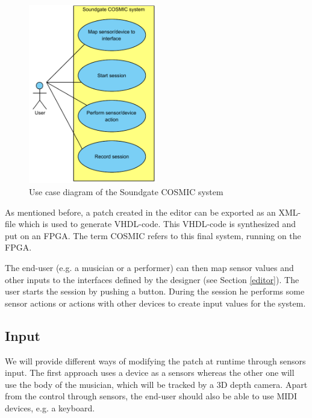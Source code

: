 	\begin{figure}[!h]
		\centering
			\includegraphics[width=0.50\textwidth]{images/User_View.pdf}
		\caption{Use case diagram of the Soundgate COSMIC system}
		\label{fig:Soundgate_UserInterface}
	\end{figure}
	
	As mentioned before, a patch created in the editor can be exported as an XML-file which is used to generate VHDL-code. 
	This VHDL-code is synthesized and put on an \ac{FPGA}. 
	The term \ac{COSMIC} refers to this final system, running on the \ac{FPGA}.
	
	The end-user (e.g. a musician or a performer) can then map sensor values and other inputs to the interfaces defined by the designer (see Section \ref{editor}). 
	The user starts the session by pushing a button. 
	During the session he performs some sensor actions or actions with other devices to create input values for the system.
	
\subsection{Input}
We will provide different ways of modifying the patch at runtime through sensors input. 
The first approach uses a device as a sensors whereas the other one will use the body of the musician, which will be tracked by a 3D depth camera. 
Apart from the control through sensors, the end-user should also be able to use MIDI devices, e.g. a keyboard.

